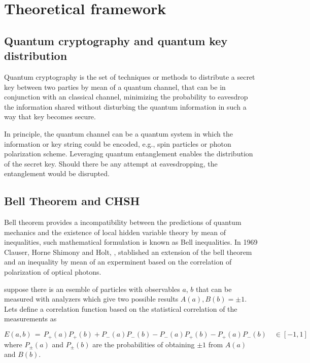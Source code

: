 \section{Theoretical framework}

\subsection{Quantum cryptography and quantum key distribution}



Quantum cryptography is the set of techniques or methods to distribute a secret key  between two parties by mean of a quantum channel, that can be in conjunction with an classical channel, minimizing the probability to eavesdrop the information shared without  disturbing the quantum information in such a way that key becomes secure. \cite{bennett2014quantum}

In principle, the quantum channel can be a quantum system in which the information or key string could be encoded, e.g., spin particles or photon polarization scheme. Leveraging quantum entanglement enables the distribution of the secret key. Should there be any attempt at eavesdropping, the entanglement would be disrupted.


\subsection{Bell Theorem and CHSH}

Bell theorem \cite{bell1964einstein} provides a incompatibility between the predictions of quantum mechanics and the existence of local hidden variable theory by  mean of inequalities, such mathematical formulation is known as Bell inequalities. In 1969 Clauser, Horne Shimony and Holt, \cite{clauser1969proposed}, stablished an extension of the bell theorem and an inequality by mean of an experminent based on the correlation of polarization of optical photons.

suppose there is an esemble of particles with observables $a$, $b$ that can be measured with analyzers which give two possible results $A(a),B(b)=\pm 1$. Lets define a correlation function based on the statistical correlation of the measurements as 

\begin{equation}\label{eqn:correlation_function_CHSH}
E(a,b)\,=\,P_{+}(a)P_{+}(b) + P_{-}(a)P_{-}(b) - P_{-}(a)P_{+}(b) - P_{+}(a)P_{-}(b) \quad \in \left[-1,1\right]
\end{equation}
where $P_{\pm}(a)$ and $P_{\pm}(b)$ are the probabilities of obtaining $\pm1$ from $A(a)$ and $B(b)$.

